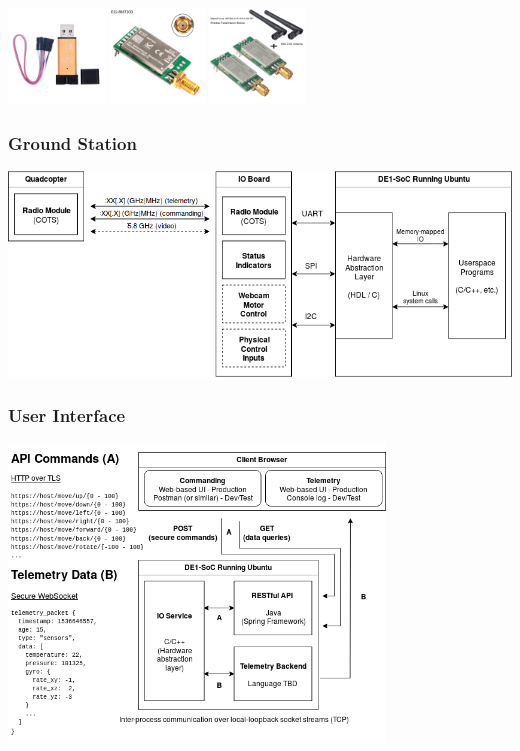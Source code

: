 \documentclass{beamer}
\begin{document}
\begin{frame}
\begin{center}
\includegraphics[width=1in]{../src/im/programmer}
\includegraphics[width=1in]{../src/im/radio1}
\includegraphics[width=1in]{../src/im/radio2}
\end{center}
\end{frame}

\begin{frame}
\frametitle{Ground Station}
\begin{center}
\includegraphics[width=\linewidth]{../src/im/ground_station}
\end{center}
\end{frame}

\begin{frame}
\frametitle{User Interface}
\begin{center}
\includegraphics[height=225pt,width=\linewidth,keepaspectratio]{../src/im/display_controller}
\end{center}
\end{frame}
\end{document}
